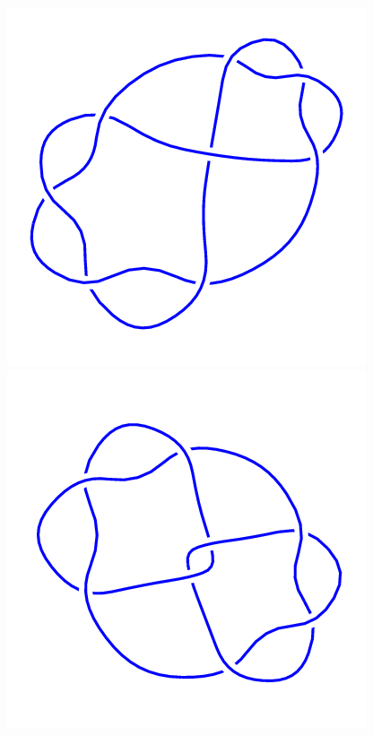 \begin{figure}[H]
\begin{minipage}[b]{.18\linewidth}
    \end{minipage}
    \begin{minipage}[b]{.18\linewidth}
        \centering
        \includegraphics[width=\linewidth]{../data/8_4.png}
    \end{minipage}
    \begin{minipage}[b]{.18\linewidth}
        \centering
        \includegraphics[width=\linewidth]{../data/8_5.png}

\end{minipage}
\end{figure}
